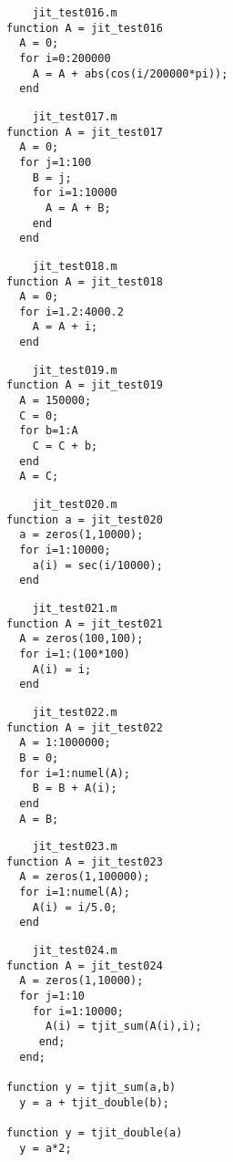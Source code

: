 \begin{verbatim}
    jit_test016.m
function A = jit_test016
  A = 0;
  for i=0:200000
    A = A + abs(cos(i/200000*pi));
  end
\end{verbatim}
\begin{verbatim}
    jit_test017.m
function A = jit_test017
  A = 0;
  for j=1:100
    B = j;
    for i=1:10000
      A = A + B;
    end
  end
\end{verbatim}
\begin{verbatim}
    jit_test018.m
function A = jit_test018
  A = 0;
  for i=1.2:4000.2
    A = A + i;
  end
\end{verbatim}
\begin{verbatim}
    jit_test019.m
function A = jit_test019
  A = 150000;
  C = 0;
  for b=1:A
    C = C + b;
  end
  A = C;
\end{verbatim}
\begin{verbatim}
    jit_test020.m
function a = jit_test020
  a = zeros(1,10000);
  for i=1:10000;
    a(i) = sec(i/10000);
  end
\end{verbatim}
\begin{verbatim}
    jit_test021.m
function A = jit_test021
  A = zeros(100,100);
  for i=1:(100*100)
    A(i) = i;
  end
\end{verbatim}
\begin{verbatim}
    jit_test022.m
function A = jit_test022
  A = 1:1000000;
  B = 0;
  for i=1:numel(A);
    B = B + A(i);
  end
  A = B;
\end{verbatim}
\begin{verbatim}
    jit_test023.m
function A = jit_test023
  A = zeros(1,100000);
  for i=1:numel(A);
    A(i) = i/5.0;
  end
\end{verbatim}
\begin{verbatim}
    jit_test024.m
function A = jit_test024
  A = zeros(1,10000);
  for j=1:10
    for i=1:10000;
      A(i) = tjit_sum(A(i),i);
     end;
  end;

function y = tjit_sum(a,b)
  y = a + tjit_double(b);

function y = tjit_double(a)
  y = a*2;
\end{verbatim}

